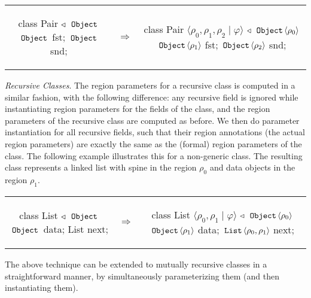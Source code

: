 \begin{tabular}{ccc}
\begin{minipage}{0.35\linewidth}
\begin{codejava}
class Pair $\triangleleft$ $\,{\tt Object}\,$ {
  $\,{\tt Object}\,$ fst;
  $\,{\tt Object}\,$ snd;
}
\end{codejava}
\end{minipage}
&
$\Rightarrow$
&
\begin{minipage}{0.6\linewidth}
\begin{codejava}
class Pair $\langle \rho_0, \rho_1, \rho_2 \; | \; \varphi \rangle$ $\triangleleft$ $\,{\tt Object}\, \langle \rho_0 \rangle$ {
  $\,{\tt Object}\, \langle \rho_1 \rangle$ fst;
  $\,{\tt Object}\, \langle \rho_2 \rangle$ snd;
}
\end{codejava}
\end{minipage}
\end{tabular}

\emph{Recursive Classes}.
The region parameters for a recursive class is computed in
a similar fashion, with the following difference: any recursive
field is ignored while instantiating region parameters for the fields of
the class, and the region parameters of the recursive class are computed
as before. We then do parameter instantiation for all recursive fields,
such that their region annotations (the actual region parameters) are
exactly the same as the (formal) region parameters of the class.
The following example illustrates this for a non-generic  class.
The resulting class represents a linked list with spine in the region
$\rho_0$ and data objects in the region $\rho_1$.

\begin{tabular}{ccc}
\begin{minipage}{0.35\linewidth}
\begin{codejava}
class List $\triangleleft$ $\,{\tt Object}\,$ {
  $\,{\tt Object}\,$ data;
  List next;
}
\end{codejava}
\end{minipage}
&
$\Rightarrow$
&
\begin{minipage}{0.65\linewidth}
\begin{codejava}
class List $\langle \rho_0, \rho_1 \; | \; \varphi \rangle$ $\triangleleft$ $\,{\tt Object}\, \langle \rho_0 \rangle$ {
  $\,{\tt Object}\, \langle \rho_1 \rangle$ data;
  $\,{\tt List}\, \langle \rho_0, \rho_1 \rangle$ next;
}
\end{codejava}
\end{minipage}
\end{tabular}

The above technique can be extended to mutually recursive classes in a
straightforward manner, by simultaneously parameterizing them (and
then instantiating them).

